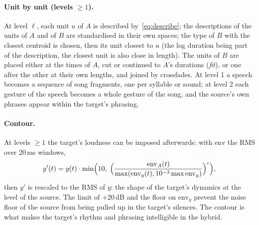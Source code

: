\documentclass[11pt,a4paper]{article}
\begin{document}
\paragraph{Unit by unit (levels $\ge 1$).} At level $\ell$, each unit
$u$ of $A$ is described by~\eqref{eq:describe}; the descriptions of the units
of $A$ and of $B$ are standardised in their own spaces; the type of $B$ with
the closest centroid is chosen, then its unit closest to $u$ (the log
duration being part of the description, the closest unit is also close in
length). The units of $B$ are placed either at the times of $A$, cut or
continued to $A$'s durations (\emph{fit}), or one after the other at their
own lengths, and joined by crossfades. At level 1 a speech becomes a
sequence of song fragments, one per syllable or sound; at level 2 each
gesture of the speech becomes a whole gesture of the song, and the source's
own phrases appear within the target's phrasing.

\paragraph{Contour.} At levels $\ge 1$ the target's loudness can be
imposed afterwards: with $\mathrm{env}$ the RMS over 20\,ms windows,
\begin{equation}
  y'(t) = y(t) \cdot \min\Bigl(10,\; \Bigl(\frac{\mathrm{env}_A(t)}{\max(\mathrm{env}_y(t), 10^{-3} \max \mathrm{env}_y)}\Bigr)^{c}\Bigr),
\end{equation}
then $y'$ is rescaled to the RMS of $y$: the shape of the target's dynamics
at the level of the source. The limit of $+20$\,dB and the floor on
$\mathrm{env}_y$ prevent the noise floor of the source from being pulled up
in the target's silences. The contour is what makes the target's rhythm and
phrasing intelligible in the hybrid.
\end{document}
